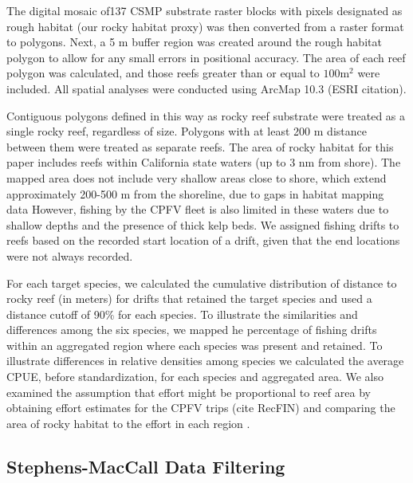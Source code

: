 \documentclass[
  12pt,
  authoryear,
  preprint,
  3p]{elsarticle}
\begin{document}
The digital mosaic of137 CSMP substrate raster blocks with pixels
designated as rough habitat (our rocky habitat proxy) was then converted
from a raster format to polygons. Next, a 5 m buffer region was created
around the rough habitat polygon to allow for any small errors in
positional accuracy. The area of each reef polygon was calculated, and
those reefs greater than or equal to \(100 \mathrm{m^2}\) were included.
All spatial analyses were conducted using ArcMap 10.3 (ESRI citation).

Contiguous polygons defined in this way as rocky reef substrate were
treated as a single rocky reef, regardless of size. Polygons with at
least 200 m distance between them were treated as separate reefs. The
area of rocky habitat for this paper includes reefs within California
state waters (up to 3 nm from shore). The mapped area does not include
very shallow areas close to shore, which extend approximately 200-500 m
from the shoreline, due to gaps in habitat mapping data However, fishing
by the CPFV fleet is also limited in these waters due to shallow depths
and the presence of thick kelp beds. We assigned fishing drifts to reefs
based on the recorded start location of a drift, given that the end
locations were not always recorded.

For each target species, we calculated the cumulative distribution of
distance to rocky reef (in meters) for drifts that retained the target
species and used a distance cutoff of 90\% for each species. To
illustrate the similarities and differences among the six species, we
mapped he percentage of fishing drifts within an aggregated region where
each species was present and retained. To illustrate differences in
relative densities among species we calculated the average CPUE, before
standardization, for each species and aggregated area. We also examined
the assumption that effort might be proportional to reef area by
obtaining effort estimates for the CPFV trips (cite RecFIN) and
comparing the area of rocky habitat to the effort in each region .

\hypertarget{stephens-maccall-data-filtering}{%
\subsection{Stephens-MacCall Data
Filtering}\label{stephens-maccall-data-filtering}}
\end{document}
